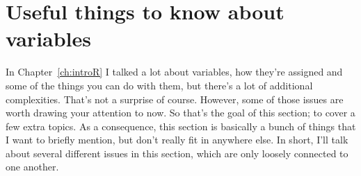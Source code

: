 %
%
%
%




\section{Useful things to know about variables~\label{sec:useful}}

In Chapter~\ref{ch:introR} I talked a lot about variables, how they're assigned and some of the things you can do with them, but there's a lot of additional complexities. That's not a surprise of course. However, some of those issues are worth drawing your attention to now. So that's the goal of this section; to cover a few extra topics. As a consequence, this section is basically a bunch of things that I want to briefly mention, but don't really fit in anywhere else. In short, I'll talk about several different issues in this section, which are only loosely connected to one another.



